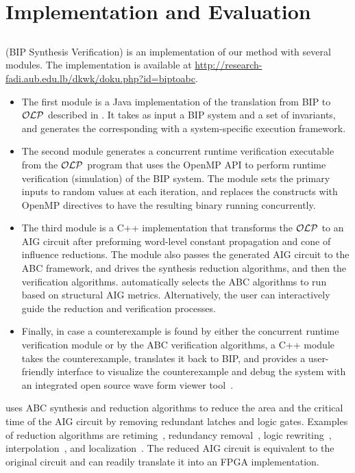 \section{Implementation and Evaluation}
\label{sec:implem}
%
\subsection{\biptool{}}
\label{chap:implementation:bip}
%
\biptool{} (BIP Synthesis Verification) is an implementation of our method with several modules. 
The implementation is available at 
\href{http://research-fadi.aub.edu.lb/dkwk/doku.php?id=biptoabc}{http://research-fadi.aub.edu.lb/dkwk/doku.php?id=biptoabc}. 
%
\begin{itemize}
  \item
  The first module is a Java implementation of the translation from BIP to $\mathcal{OLP}$ described in .
It takes as input a BIP system and a set of invariants,
and generates the corresponding \caig{} with a system-specific execution framework. 
%
\item
The second module generates a concurrent runtime verification 
  executable from the $\mathcal{OLP}$ 
  program that uses the OpenMP API to perform runtime 
  verification (simulation) of the BIP system. 
  The module sets the primary inputs to random values at each iteration,
  and replaces the  constructs with OpenMP directives
  to have the resulting binary running concurrently. 
%
  \item
  The third module is a C++ implementation that transforms the $\mathcal{OLP}$ to an AIG circuit after preforming word-level constant propagation and cone of influence reductions. 
    The module also passes the generated AIG circuit to the ABC framework, and drives the synthesis reduction algorithms, and then the verification algorithms.
    \biptool{} automatically selects the ABC algorithms to run based on structural
    AIG metrics. Alternatively, the user can 
    interactively guide the reduction and verification processes. 
%
\item Finally, in case a counterexample is found by either the 
concurrent runtime verification module or by the ABC verification algorithms, 
a C++ module takes the counterexample, 
translates it back to BIP, and provides a user-friendly interface 
to visualize the counterexample and debug the system with an integrated open source wave form viewer tool~\cite{bybell2010gtkwave}.  
\end{itemize}
%
\biptool{} uses ABC synthesis and reduction algorithms to reduce the area 
and the critical time of the AIG circuit by 
removing redundant latches and logic gates.
Examples of reduction algorithms are
retiming~\cite{KuBa01}, 
redundancy removal~\cite{HmBPK05,KuMP01,BjesseC00,aziz-fmsd-00}, 
logic rewriting~\cite{BjBo04}, interpolation~\cite{McMillan03}, 
and localization~\cite{Wang03}. 
%
The reduced AIG circuit is equivalent to the original circuit and \biptool{}
can readily translate it into an FPGA implementation. 

